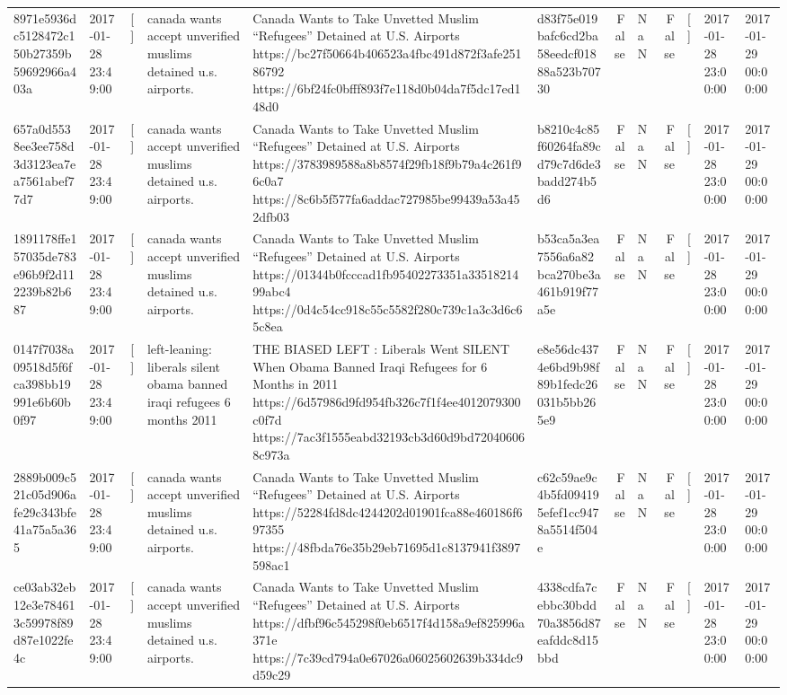 \begin{tabular}{llllllrlrlll}
8971e5936dc5128472c150b27359b59692966a403a & 2017-01-28 23:49:00 & [] & canada wants accept unverified muslims detained u.s. airports. & Canada Wants to Take Unvetted Muslim “Refugees” Detained at U.S. Airports https://bc27f50664b406523a4fbc491d872f3afe25186792 https://6bf24fc0bfff893f7e118d0b04da7f5dc17ed148d0 & d83f75e019bafc6cd2ba58eedcf01888a523b70730 & False & NaN & False & [] & 2017-01-28 23:00:00 & 2017-01-29 00:00:00 \\
657a0d5538ee3ee758d3d3123ea7ea7561abef77d7 & 2017-01-28 23:49:00 & [] & canada wants accept unverified muslims detained u.s. airports. & Canada Wants to Take Unvetted Muslim “Refugees” Detained at U.S. Airports https://3783989588a8b8574f29fb18f9b79a4c261f96c0a7 https://8c6b5f577fa6addac727985be99439a53a452dfb03 & b8210c4c85f60264fa89cd79c7d6de3badd274b5d6 & False & NaN & False & [] & 2017-01-28 23:00:00 & 2017-01-29 00:00:00 \\
1891178ffe157035de783e96b9f2d112239b82b687 & 2017-01-28 23:49:00 & [] & canada wants accept unverified muslims detained u.s. airports. & Canada Wants to Take Unvetted Muslim “Refugees” Detained at U.S. Airports https://01344b0fcccad1fb95402273351a3351821499abc4 https://0d4c54cc918c55c5582f280c739c1a3c3d6c65c8ea & b53ca5a3ea7556a6a82bca270be3a461b919f77a5e & False & NaN & False & [] & 2017-01-28 23:00:00 & 2017-01-29 00:00:00 \\
0147f7038a09518d5f6fca398bb19991e6b60b0f97 & 2017-01-28 23:49:00 & [] & left-leaning: liberals silent obama banned iraqi refugees 6 months 2011 & THE BIASED LEFT : Liberals Went SILENT When Obama Banned Iraqi Refugees for 6 Months in 2011 https://6d57986d9fd954fb326c7f1f4ee4012079300c0f7d https://7ac3f1555eabd32193cb3d60d9bd720406068c973a & e8e56dc4374e6bd9b98f89b1fedc26031b5bb265e9 & False & NaN & False & [] & 2017-01-28 23:00:00 & 2017-01-29 00:00:00 \\
2889b009c521c05d906afe29c343bfe41a75a5a365 & 2017-01-28 23:49:00 & [] & canada wants accept unverified muslims detained u.s. airports. & Canada Wants to Take Unvetted Muslim “Refugees” Detained at U.S. Airports https://52284fd8dc4244202d01901fca88e460186f697355 https://48fbda76e35b29eb71695d1c8137941f3897598ac1 & c62c59ae9c4b5fd094195efef1cc9478a5514f504e & False & NaN & False & [] & 2017-01-28 23:00:00 & 2017-01-29 00:00:00 \\
ce03ab32eb12e3e784613c59978f89d87e1022fe4c & 2017-01-28 23:49:00 & [] & canada wants accept unverified muslims detained u.s. airports. & Canada Wants to Take Unvetted Muslim “Refugees” Detained at U.S. Airports https://dfbf96c545298f0eb6517f4d158a9ef825996a371e https://7c39cd794a0e67026a06025602639b334dc9d59c29 & 4338cdfa7cebbc30bdd70a3856d87eafddc8d15bbd & False & NaN & False & [] & 2017-01-28 23:00:00 & 2017-01-29 00:00:00 \\

\end{tabular}
